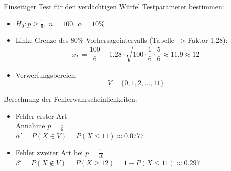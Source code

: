 \clearpage
\begin{bsp}
    {Einseitiger Test für den verdächtigen Würfel}{}
    Testparameter bestimmen:
    \begin{itemize}
        \item \( H_0 : p \ge \frac{1}{6},\; n = 100,\; \alpha = 10\% \)
        \item Linke Grenze des 80\%-Vorhersageintervalls (Tabelle --> Faktor 1.28):
              \[
                  x_L = \frac{100}{6} - 1.28 \cdot \sqrt{100 \cdot \frac{1}{6} \cdot \frac{5}{6}} \approx 11.9 \approx 12
              \]
        \item Verwerfungsbereich:
              \[
                  V = \{0, 1, 2, \ldots, 11\}
              \]
    \end{itemize}

    Berechnung der Fehlerwahrscheinlichkeiten:
    \begin{itemize}
        \item Fehler erster Art \\
              Annahme \( p = \frac{1}{6} \) \\
              \(\alpha' = P(X \in V) = P(X \le 11) \approx 0.0777 \)

        \item Fehler zweiter Art bei \( p = \frac{1}{10} \) \\
              \(\beta' = P(X \notin V) = P(X \ge 12) = 1 - P(X \le 11) \approx 0.297 \)
    \end{itemize}
\end{bsp}
\clearpage
